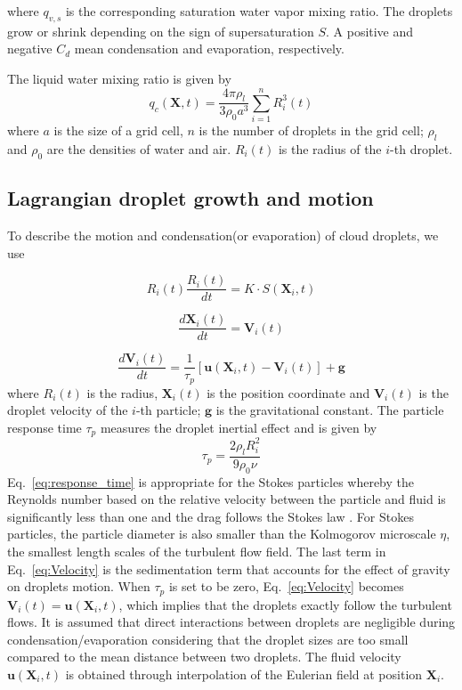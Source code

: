 \documentclass[draft,linenumbers]{agujournal}
\newcommand{\Eq}[1]{Eq.~\eqref{#1}} \newcommand{\Fig}[1]{Figure~\ref{#1}}
\begin{document}
where $q_{v,s}$ is the corresponding saturation water vapor mixing ratio. The droplets 
grow or shrink depending on the sign of supersaturation $S$. A positive and negative 
$C_d$ mean condensation and evaporation, respectively.

The liquid water mixing ratio is given by
\begin{equation}
q_{c}(\mathbf{X},t)=\frac{4\pi\rho_{l}}{3\rho_{0}a^{3}}\sum_{i=1}^{n}R_{i}^{3}(t)\label{eq:cloud_water}
\end{equation}
where $a$ is the size of a grid cell, $n$ is the number of droplets
in the grid cell; $\rho_{l}$ and $\rho_{0}$ are the densities of water and air. $R_{i}(t)$ is the radius of the $i$-th droplet.

\subsection{Lagrangian droplet growth and motion}

To describe the motion and condensation(or evaporation) of cloud droplets, we use

\begin{equation}
R_i(t)\frac{R_i(t)}{dt}=K\cdot S(\mathbf{X}_i,t)\label{eq:Radius}
\end{equation}


\begin{equation}
\frac{d\mathbf{X}_i(t)}{dt}=\mathbf{V}_i(t)\label{eq:Coords}
\end{equation}


\begin{equation}
\frac{d\mathbf{V}_i(t)}{dt}=\frac{1}{\tau_{p}}[\mathbf{u}(\mathbf{X}_i,t)-\mathbf{V}_i(t)]+\mathbf{g}\label{eq:Velocity}
\end{equation}
where $R_i(t)$ is the radius, $\mathbf{X}_i(t)$ is the position
coordinate and $\mathbf{V}_i(t)$ is the droplet velocity of the $i$-th particle; $\mathbf{g}$ is the gravitational constant.
The particle response time $\tau_p$ measures the droplet inertial effect and is given by
\begin{equation}
\tau_{p}=\frac{2\rho_{l}R_i^{2}}{9\rho_{0}\nu}
\label{eq:response_time}
\end{equation}
\Eq{eq:response_time} is appropriate for the Stokes particles whereby the Reynolds number 
based on the relative velocity between the particle and fluid is significantly less than one and the 
drag follows the Stokes law \citep{Eaton94}. For Stokes particles, the particle diameter is also smaller than the Kolmogorov microscale $\eta$, the smallest length scales of the turbulent flow field.
The last term in \Eq{eq:Velocity} is the sedimentation term that accounts for the effect of 
gravity on droplets motion. When $\tau_{p}$ is set to be zero, \Eq{eq:Velocity} becomes $\mathbf{V}_i(t)=\mathbf{u}(\mathbf{X}_i,t)$, 
which implies that the droplets exactly follow the turbulent flows. 
It is assumed that direct interactions between droplets are negligible during 
condensation/evaporation considering that the droplet sizes are too small compared to the mean distance between two droplets. The fluid velocity $\mathbf{u}(\mathbf{X}_i, t)$ 
is obtained through  interpolation of the Eulerian field at position $\mathbf{X}_i$.
\end{document}
